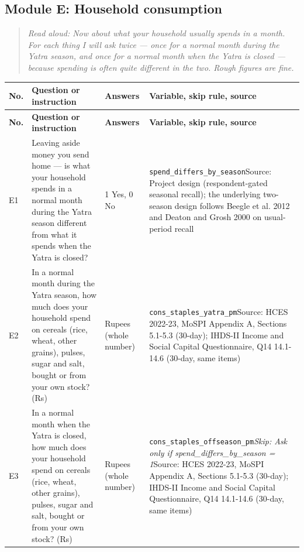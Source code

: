 \documentclass[10pt]{article}
\begin{document}
\subsection*{Module E: Household consumption}
\begin{quote}\small\textit{Read aloud: Now about what your household usually spends in a month. For each thing I will ask twice — once for a normal month during the Yatra season, and once for a normal month when the Yatra is closed — because spending is often quite different in the two. Rough figures are fine.}\end{quote}
{\scriptsize
\begin{longtable}{p{0.8cm}p{6.4cm}p{3.6cm}p{5.8cm}}
\toprule
\textbf{No.} & \textbf{Question or instruction} & \textbf{Answers} & \textbf{Variable, skip rule, source} \\
\midrule
\endfirsthead
\toprule
\textbf{No.} & \textbf{Question or instruction} & \textbf{Answers} & \textbf{Variable, skip rule, source} \\
\midrule
\endhead
E1 & Leaving aside money you send home — is what your household spends in a normal month during the Yatra season different from what it spends when the Yatra is closed? & 1 Yes, 0 No & \texttt{spend\_differs\_by\_season}\newline Source: Project design (respondent-gated seasonal recall); the underlying two-season design follows Beegle et al. 2012 and Deaton and Grosh 2000 on usual-period recall \\
E2 & In a normal month during the Yatra season, how much does your household spend on cereals (rice, wheat, other grains), pulses, sugar and salt, bought or from your own stock? (Rs) & Rupees (whole number) & \texttt{cons\_staples\_yatra\_pm}\newline Source: HCES 2022-23, MoSPI Appendix A, Sections 5.1-5.3 (30-day); IHDS-II Income and Social Capital Questionnaire, Q14 14.1-14.6 (30-day, same items) \\
E3 & In a normal month when the Yatra is closed, how much does your household spend on cereals (rice, wheat, other grains), pulses, sugar and salt, bought or from your own stock? (Rs) & Rupees (whole number) & \texttt{cons\_staples\_offseason\_pm}\newline \textit{Skip: Ask only if spend\_differs\_by\_season = 1}\newline Source: HCES 2022-23, MoSPI Appendix A, Sections 5.1-5.3 (30-day); IHDS-II Income and Social Capital Questionnaire, Q14 14.1-14.6 (30-day, same items) \\

\end{longtable}}
\end{document}
